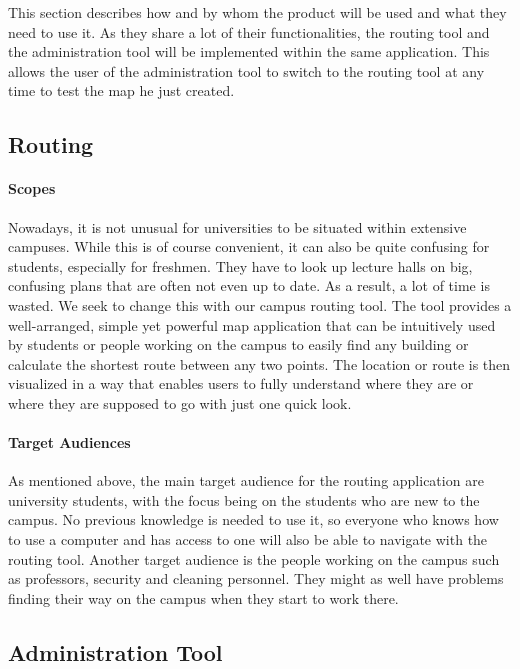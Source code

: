 This section describes how and by whom the product will be used and what they need to use it.
As they share a lot of their functionalities, the routing tool and the administration tool will be implemented within the same application. This allows
the user of the administration tool to switch to the routing tool at any time to test the map he just created.

\subsection{Routing}
\paragraph{Scopes}
Nowadays, it is not unusual for universities to be situated within extensive campuses. While this is of course convenient, it can also be
quite confusing for students, especially for freshmen. They have to look up lecture halls on big, confusing plans that are often not even up to date.
As a result, a lot of time is wasted. We seek to change this with our campus routing tool. The tool provides a well-arranged, simple yet powerful
map application that can be intuitively used by students or people working on the campus to easily find any building or calculate the shortest
route between any two points. The location or route is then visualized in a way that enables users to fully understand where they are or where they are
supposed to go with just one quick look.

\paragraph{Target Audiences}
As mentioned above, the main target audience for the routing application are university students, with the focus being on the students who are new to
the campus. No previous knowledge is needed to use it, so everyone who knows how to use a computer and has access to one will also be able to navigate
with the routing tool. Another target audience is the people working on the campus such as professors, security and cleaning personnel. They might as
well have problems finding their way on the campus when they start to work there.

\subsection{Administration Tool}
